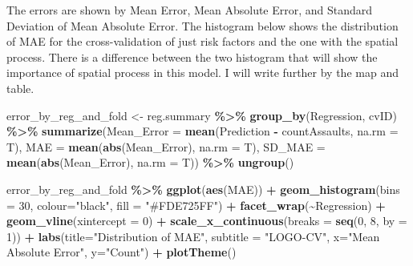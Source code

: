 \documentclass[
]{article}
\newenvironment{Shaded}{\begin{snugshade}}{\end{snugshade}}
\newcommand{\AttributeTok}[1]{\textcolor[rgb]{0.13,0.29,0.53}{#1}}
\newcommand{\DecValTok}[1]{\textcolor[rgb]{0.00,0.00,0.81}{#1}}
\newcommand{\FunctionTok}[1]{\textcolor[rgb]{0.13,0.29,0.53}{\textbf{#1}}}
\newcommand{\NormalTok}[1]{#1}
\newcommand{\OtherTok}[1]{\textcolor[rgb]{0.56,0.35,0.01}{#1}}
\newcommand{\SpecialCharTok}[1]{\textcolor[rgb]{0.81,0.36,0.00}{\textbf{#1}}}
\newcommand{\StringTok}[1]{\textcolor[rgb]{0.31,0.60,0.02}{#1}}
\begin{document}
The errors are shown by Mean Error, Mean Absolute Error, and Standard
Deviation of Mean Absolute Error. The histogram below shows the
distribution of MAE for the cross-validation of just risk factors and
the one with the spatial process. There is a difference between the two
histogram that will show the importance of spatial process in this
model. I will write further by the map and table.

\begin{Shaded}
\begin{Highlighting}[]
\NormalTok{error\_by\_reg\_and\_fold }\OtherTok{\textless{}{-}} 
\NormalTok{  reg.summary }\SpecialCharTok{\%\textgreater{}\%}
    \FunctionTok{group\_by}\NormalTok{(Regression, cvID) }\SpecialCharTok{\%\textgreater{}\%} 
    \FunctionTok{summarize}\NormalTok{(}\AttributeTok{Mean\_Error =} \FunctionTok{mean}\NormalTok{(Prediction }\SpecialCharTok{{-}}\NormalTok{ countAssaults, }\AttributeTok{na.rm =}\NormalTok{ T),}
              \AttributeTok{MAE =} \FunctionTok{mean}\NormalTok{(}\FunctionTok{abs}\NormalTok{(Mean\_Error), }\AttributeTok{na.rm =}\NormalTok{ T),}
              \AttributeTok{SD\_MAE =} \FunctionTok{mean}\NormalTok{(}\FunctionTok{abs}\NormalTok{(Mean\_Error), }\AttributeTok{na.rm =}\NormalTok{ T)) }\SpecialCharTok{\%\textgreater{}\%}
  \FunctionTok{ungroup}\NormalTok{()}

\NormalTok{error\_by\_reg\_and\_fold }\SpecialCharTok{\%\textgreater{}\%}
  \FunctionTok{ggplot}\NormalTok{(}\FunctionTok{aes}\NormalTok{(MAE)) }\SpecialCharTok{+} 
    \FunctionTok{geom\_histogram}\NormalTok{(}\AttributeTok{bins =} \DecValTok{30}\NormalTok{, }\AttributeTok{colour=}\StringTok{"black"}\NormalTok{, }\AttributeTok{fill =} \StringTok{"\#FDE725FF"}\NormalTok{) }\SpecialCharTok{+}
    \FunctionTok{facet\_wrap}\NormalTok{(}\SpecialCharTok{\textasciitilde{}}\NormalTok{Regression) }\SpecialCharTok{+}  
    \FunctionTok{geom\_vline}\NormalTok{(}\AttributeTok{xintercept =} \DecValTok{0}\NormalTok{) }\SpecialCharTok{+} \FunctionTok{scale\_x\_continuous}\NormalTok{(}\AttributeTok{breaks =} \FunctionTok{seq}\NormalTok{(}\DecValTok{0}\NormalTok{, }\DecValTok{8}\NormalTok{, }\AttributeTok{by =} \DecValTok{1}\NormalTok{)) }\SpecialCharTok{+} 
    \FunctionTok{labs}\NormalTok{(}\AttributeTok{title=}\StringTok{"Distribution of MAE"}\NormalTok{, }\AttributeTok{subtitle =} \StringTok{"LOGO{-}CV"}\NormalTok{,}
         \AttributeTok{x=}\StringTok{"Mean Absolute Error"}\NormalTok{, }\AttributeTok{y=}\StringTok{"Count"}\NormalTok{) }\SpecialCharTok{+}
    \FunctionTok{plotTheme}\NormalTok{()}
\end{Highlighting}
\end{Shaded}
\end{document}
